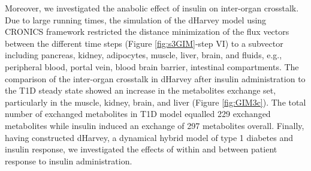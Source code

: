 Moreover, we investigated the anabolic effect of insulin on inter-organ crosstalk. Due to large running times, the simulation of the dHarvey model using CRONICS framework restricted the distance minimization of the flux vectors between the different time steps (Figure \ref{fig:s3GIM}-step VI) to a subvector including pancreas, kidney, adipocytes, muscle, liver, brain, and fluids, e.g., peripheral blood, portal vein, blood brain barrier, intestinal compartments. The comparison of the inter-organ crosstalk in dHarvey after insulin administration to the T1D steady state showed an increase in the metabolites exchange set, particularly in the muscle, kidney, brain, and liver (Figure \ref{fig:GIM3c}). The total number of exchanged metabolites in T1D model equalled 229 exchanged metabolites while insulin induced an exchange of 297 metabolites overall. 
Finally, having constructed dHarvey, a dynamical hybrid model of type 1 diabetes and insulin response, we investigated the effects of within and between patient response to insulin administration.
